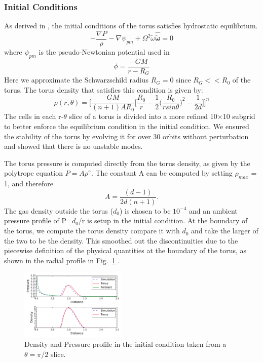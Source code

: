 \documentclass[iop,revtex4]{emulateapj}
\begin{document}
\subsubsection{Initial Conditions\label{sec:IC}}
\par As derived in \cite{Papaloizou:1984A}, the initial conditions of the torus satisfies hydrostatic equilibrium.
\begin{equation}
-\frac{\nabla P}{\rho}-\nabla \psi_{pm} +\Omega^2\tilde{\omega}\mathbf{\hat{\tilde{\omega}}}=0
\end{equation}
where $\psi_{pm}$ is the pseudo-Newtonian potential used in \cite{Blaes:1987A}
\begin{equation}
\phi = \frac{-GM}{r-R_G}
\end{equation}
 Here we approximate the Schwarzschild radius $R_G=0$ since $R_G <<R_0$ of the torus. The torus density that satisfies this condition is given by: 
\begin{equation}
\rho(r,\theta) = \Bigg[\frac{GM}{(n+1)AR_0}\Big[\frac{R_0}{r}-\frac{1}{2}\Bigg(\frac{R_0}{r sin\theta}\Bigg)^2-\frac{1}{2d}\Big]\Bigg]^n
\end{equation}
The cells in each r-$\theta$ slice of a torus is divided into a more refined 10$\times$10 subgrid to better enforce the equilibrium condition in the initial condition. We ensured the stability of the torus by evolving it for over 30 orbits without perturbation and showed that there is no unstable modes. 
\par The torus pressure is computed directly from the torus density, as given by the polytrope equation $P = A\rho^\gamma$.  The constant A can be computed by setting $\rho_{max}$ = 1, and therefore $$A =\frac{(d-1)}{2d(n+1)}.$$
The gas density outside the torus ($d_0$) is chosen to be $10^{-4}$ and an ambient pressure profile of P=$d_0$/r is setup in the initial condition. At the boundary of the torus, we compute the torus density compare it with $d_0$ and take the larger of the two to be the density. This smoothed out the discontinuities due to the piecewise definition of the physical quantities at the boundary of the torus, as shown in the radial profile in Fig.~\ref{d_p_profile} .
\begin{figure}
\includegraphics[width=0.45\textwidth]{plots/profile.pdf}
\caption{Density and Pressure profile in the initial condition taken from a $\theta = \pi/2$ slice.}
\label{d_p_profile}
\end{figure}
\end{document}
